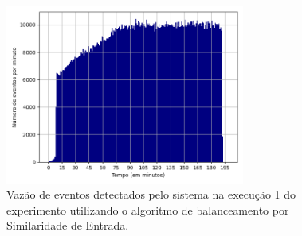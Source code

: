 



\begin{figure}[h]
\centering
\includegraphics[width=0.7\textwidth]{figuras/graphics/histogram_vazao_6-dez-is.png}
\caption{Vazão de eventos detectados pelo sistema na execução 1 do experimento utilizando o algoritmo de balanceamento por Similaridade de Entrada.}
\label{fig:vazao_6-dez-is}
\end{figure}



